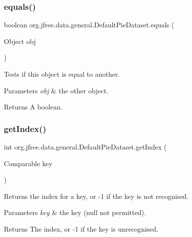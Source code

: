 \subsubsection{\texorpdfstring{equals()}{equals()}}
{\footnotesize\ttfamily boolean org.\+jfree.\+data.\+general.\+Default\+Pie\+Dataset.\+equals (\begin{DoxyParamCaption}\item[{Object}]{obj }\end{DoxyParamCaption})}

Tests if this object is equal to another.


\begin{DoxyParams}{Parameters}
{\em obj} & the other object.\\
\hline
\end{DoxyParams}
\begin{DoxyReturn}{Returns}
A boolean. 
\end{DoxyReturn}
\mbox{\label{classorg_1_1jfree_1_1data_1_1general_1_1_default_pie_dataset_a06709cd535587bc7fed697d3370b81b4}} 
\subsubsection{\texorpdfstring{get\+Index()}{getIndex()}}
{\footnotesize\ttfamily int org.\+jfree.\+data.\+general.\+Default\+Pie\+Dataset.\+get\+Index (\begin{DoxyParamCaption}\item[{Comparable}]{key }\end{DoxyParamCaption})}

Returns the index for a key, or -\/1 if the key is not recognised.


\begin{DoxyParams}{Parameters}
{\em key} & the key ({\ttfamily null} not permitted).\\
\hline
\end{DoxyParams}
\begin{DoxyReturn}{Returns}
The index, or {\ttfamily -\/1} if the key is unrecognised.
\end{DoxyReturn}

